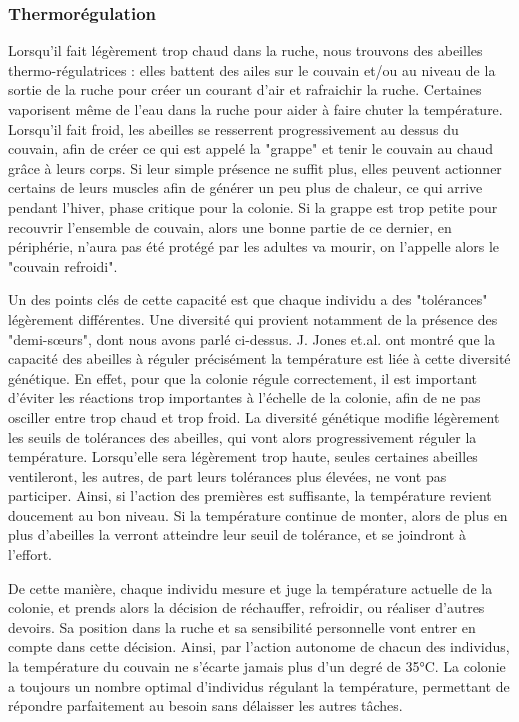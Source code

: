 			\subsubsection{Thermorégulation}	
			
			Lorsqu'il fait légèrement trop chaud dans la ruche, nous trouvons des abeilles thermo-régulatrices : elles battent des ailes sur le couvain et/ou au niveau de la sortie de la ruche pour créer un courant d'air et rafraichir la ruche. Certaines vaporisent même de l'eau dans la ruche pour aider à faire chuter la température. Lorsqu'il fait froid, les abeilles se resserrent progressivement au dessus du couvain, afin de créer ce qui est appelé la "grappe" et tenir le couvain au chaud grâce à leurs corps. Si leur simple présence ne suffit plus, elles peuvent actionner certains de leurs muscles afin de générer un peu plus de chaleur, ce qui arrive pendant l'hiver, phase critique pour la colonie. Si la grappe est trop petite pour recouvrir l'ensemble de couvain, alors une bonne partie de ce dernier, en périphérie, n'aura pas été protégé par les adultes va mourir, on l'appelle alors le "couvain refroidi".
					
			Un des points clés de cette capacité est que chaque individu a des "tolérances" légèrement différentes. Une diversité qui provient notamment de la présence des "demi-sœurs", dont nous avons parlé ci-dessus. J. Jones et.al. \cite{jones_honey_2004} ont montré que la capacité des abeilles à réguler précisément la température est liée à cette diversité génétique. En effet, pour que la colonie régule correctement, il est important d'éviter les réactions trop importantes à l'échelle de la colonie, afin de ne pas osciller entre trop chaud et trop froid. La diversité génétique modifie légèrement les seuils de tolérances des abeilles, qui vont alors progressivement réguler la température. Lorsqu'elle sera légèrement trop haute, seules certaines abeilles ventileront, les autres, de part leurs tolérances plus élevées, ne vont pas participer. Ainsi, si l'action des premières est suffisante, la température revient doucement au bon niveau. Si la température continue de monter, alors de plus en plus d'abeilles la verront atteindre leur seuil de tolérance, et se joindront à l'effort.
			
			De cette manière, chaque individu mesure et juge la température actuelle de la colonie, et prends alors la décision de réchauffer, refroidir, ou réaliser d'autres devoirs. Sa position dans la ruche et sa sensibilité personnelle vont entrer en compte dans cette décision. Ainsi, par l'action autonome de chacun des individus, la température du couvain ne s'écarte jamais plus d'un degré de 35°C. La colonie a toujours un nombre optimal d'individus régulant la température, permettant de répondre parfaitement au besoin sans délaisser les autres tâches.
			
